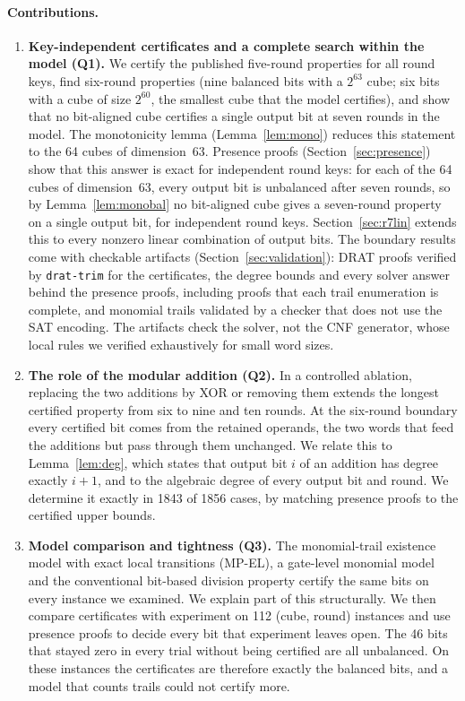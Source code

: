 \documentclass[11pt,a4paper]{article}
\theoremstyle{definition}
\theoremstyle{remark}
\newcommand{\MPEL}{\textsf{MP-EL}}
\begin{document}
\paragraph{Contributions.}
\begin{enumerate}
\item \textbf{Key-independent certificates and a complete search within the model (Q1).} We certify the published five-round properties for all round keys, find six-round properties (nine balanced bits with a $2^{63}$ cube; six bits with a cube of size $2^{60}$, the smallest cube that the model certifies), and show that no bit-aligned cube certifies a single output bit at seven rounds in the model. The monotonicity lemma (Lemma~\ref{lem:mono}) reduces this statement to the 64 cubes of dimension~63. Presence proofs (Section~\ref{sec:presence}) show that this answer is exact for independent round keys: for each of the 64 cubes of dimension~63, every output bit is unbalanced after seven rounds, so by Lemma~\ref{lem:monobal} no bit-aligned cube gives a seven-round property on a single output bit, for independent round keys. Section~\ref{sec:r7lin} extends this to every nonzero linear combination of output bits. The boundary results come with checkable artifacts (Section~\ref{sec:validation}): DRAT proofs verified by \texttt{drat-trim} for the certificates, the degree bounds and every solver answer behind the presence proofs, including proofs that each trail enumeration is complete, and monomial trails validated by a checker that does not use the SAT encoding. The artifacts check the solver, not the CNF generator, whose local rules we verified exhaustively for small word sizes.
\item \textbf{The role of the modular addition (Q2).} In a controlled ablation, replacing the two additions by XOR or removing them extends the longest certified property from six to nine and ten rounds. At the six-round boundary every certified bit comes from the retained operands, the two words that feed the additions but pass through them unchanged. We relate this to Lemma~\ref{lem:deg}, which states that output bit $i$ of an addition has degree exactly $i+1$, and to the algebraic degree of every output bit and round. We determine it exactly in 1843 of 1856 cases, by matching presence proofs to the certified upper bounds.
\item \textbf{Model comparison and tightness (Q3).} The monomial-trail existence model with exact local transitions (\MPEL), a gate-level monomial model and the conventional bit-based division property certify the same bits on every instance we examined. We explain part of this structurally. We then compare certificates with experiment on 112 (cube, round) instances and use presence proofs to decide every bit that experiment leaves open. The 46 bits that stayed zero in every trial without being certified are all unbalanced. On these instances the certificates are therefore exactly the balanced bits, and a model that counts trails could not certify more.
\end{enumerate}
\end{document}
